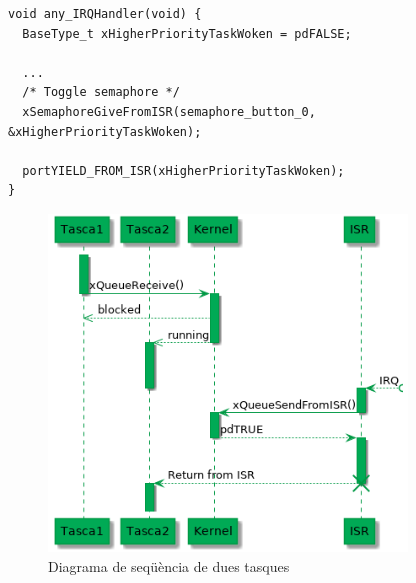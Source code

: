 \begin{lstlisting}[style=customc,caption=Codi ISR d'exemple,label=ISRYield]
void any_IRQHandler(void) {
  BaseType_t xHigherPriorityTaskWoken = pdFALSE;

  ...
  /* Toggle semaphore */
  xSemaphoreGiveFromISR(semaphore_button_0, &xHigherPriorityTaskWoken);

  portYIELD_FROM_ISR(xHigherPriorityTaskWoken);
}
\end{lstlisting}


\begin{figure}
 \centering
 \includegraphics[width=0.85\textwidth, keepaspectratio]{imatges/FreeRTOSISR.png}
 \caption{Diagrama de seqüència de dues tasques}
 \label{fig:FreeRTOSISR}
\end{figure}


